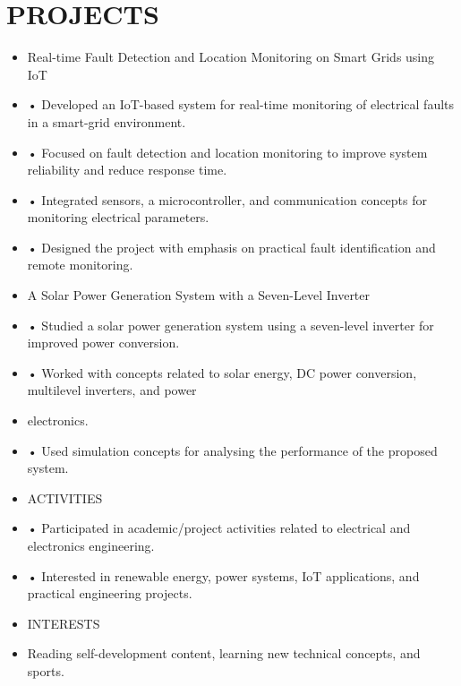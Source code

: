 \documentclass[10pt,a4paper]{article}
\begin{document}
\section*{PROJECTS}
\begin{itemize}[leftmargin=*]
    \item Real-time Fault Detection and Location Monitoring on Smart Grids using IoT
    \item • Developed an IoT-based system for real-time monitoring of electrical faults in a smart-grid environment.
    \item • Focused on fault detection and location monitoring to improve system reliability and reduce response time.
    \item • Integrated sensors, a microcontroller, and communication concepts for monitoring electrical parameters.
    \item • Designed the project with emphasis on practical fault identification and remote monitoring.
    \item A Solar Power Generation System with a Seven-Level Inverter
    \item • Studied a solar power generation system using a seven-level inverter for improved power conversion.
    \item • Worked with concepts related to solar energy, DC power conversion, multilevel inverters, and power
    \item electronics.
    \item • Used simulation concepts for analysing the performance of the proposed system.
    \item ACTIVITIES
    \item • Participated in academic/project activities related to electrical and electronics engineering.
    \item • Interested in renewable energy, power systems, IoT applications, and practical engineering projects.
    \item INTERESTS
    \item Reading self-development content, learning new technical concepts, and sports.
\end{itemize}
\end{document}
